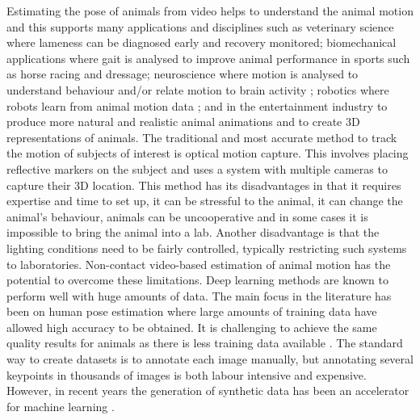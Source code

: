 \documentclass[final]{cvpr}
\begin{document}
Estimating the pose of animals from video \cite{Gosztolai2020.09.18.292680, graving2019deepposekit, Mathis2018, Pereira331181} helps to understand the animal motion and this supports many applications and disciplines such as veterinary science where lameness can be diagnosed early and recovery monitored; biomechanical applications where gait is analysed to improve animal performance in sports such as horse racing and dressage; neuroscience where motion is analysed to understand behaviour and/or relate motion to brain activity \cite{info:doi/10.2196/16194}; robotics where robots learn from animal motion data \cite{RoboImitationPeng20}; and in the entertainment industry to produce more natural and realistic animal animations and to create 3D representations of animals. The traditional and most accurate method to track the motion of subjects of interest is optical motion capture. This involves placing reflective markers on the subject and uses a system with multiple cameras to capture their 3D location. This method has its disadvantages in that it requires expertise and time to set up, it can be stressful to the animal, it can change the animal's behaviour, animals can be uncooperative and in some cases it is impossible to bring the animal into a lab. Another disadvantage is that the lighting conditions need to be fairly controlled, typically restricting such systems to laboratories. Non-contact video-based estimation of animal motion has the potential to overcome these limitations. Deep learning methods are known to perform well with huge amounts of data. The main focus in the literature has been on human pose estimation \cite{DBLP:journals/corr/abs-1812-08008, DBLP:journals/corr/FangXL16, DBLP:journals/corr/HeGDG17,
DBLP:journals/corr/NewellYD16,DBLP:journals/corr/abs-1902-09212, DBLP:journals/corr/TompsonGJLB14, DBLP:journals/corr/ToshevS13} where large amounts of training data have allowed high accuracy to be obtained. It is challenging to achieve the same quality results for animals as there is less training data available \cite{biggs2020left, biggs2018creatures,DBLP:journals/corr/abs-1908-05806,Kearney_2020_CVPR}. The standard way to create datasets is to annotate each image manually, but annotating several keypoints in thousands of images is both labour intensive and expensive. However, in recent years the generation of synthetic data has been an accelerator for machine learning \cite{DBLP:journals/corr/ChenWLSTLCC16,DBLP:journals/corr/abs-1912-08265,DBLP:journals/corr/abs-1910-07113,DBLP:journals/corr/RichterVRK16,DBLP:journals/corr/abs-1908-07201}. 
\end{document}
